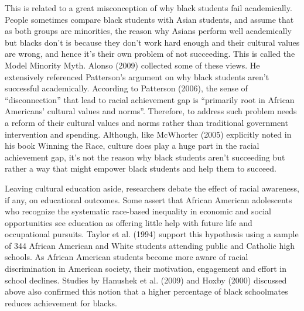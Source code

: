 \noindent This is related to a great misconception of why black students fail academically. People sometimes compare black students with Asian students, and assume that as both groups are minorities, the reason why Asians perform well academically but blacks don’t is because they don’t work hard enough and their cultural values are wrong, and hence it’s their own problem of not succeeding. This is called the Model Minority Myth. Alonso (2009) collected some of these views. He extensively referenced Patterson’s argument on why black students aren’t successful academically. According to Patterson (2006), the sense of “disconnection” that lead to racial achievement gap is “primarily root in African Americans’ cultural values and norms”. Therefore, to address such problem needs a reform of their cultural values and norms rather than traditional government intervention and spending. Although, like McWhorter (2005) explicitly noted in his book Winning the Race, culture does play a huge part in the racial achievement gap, it’s not the reason why black students aren’t succeeding but rather a way that might empower black students and help them to succeed.

\noindent Leaving cultural education aside, researchers debate the effect of racial awareness, if any, on educational outcomes. Some assert that African American adolescents who recognize the systematic race-based inequality in economic and social opportunities see education as offering little help with future life and occupational pursuits. Taylor et al. (1994) support this hypothesis using a sample of 344 African American and White students attending public and Catholic high schools. As African American students become more aware of racial discrimination in American society, their motivation, engagement and effort in school declines. Studies by Hanushek et al. (2009) and Hoxby (2000) discussed above also confirmed this notion that a higher percentage of black schoolmates reduces achievement for blacks.


